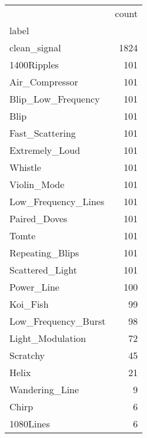 \begin{tabular}{lr}
\toprule
 & count \\
label &  \\
\midrule
clean_signal & 1824 \\
1400Ripples & 101 \\
Air_Compressor & 101 \\
Blip_Low_Frequency & 101 \\
Blip & 101 \\
Fast_Scattering & 101 \\
Extremely_Loud & 101 \\
Whistle & 101 \\
Violin_Mode & 101 \\
Low_Frequency_Lines & 101 \\
Paired_Doves & 101 \\
Tomte & 101 \\
Repeating_Blips & 101 \\
Scattered_Light & 101 \\
Power_Line & 100 \\
Koi_Fish & 99 \\
Low_Frequency_Burst & 98 \\
Light_Modulation & 72 \\
Scratchy & 45 \\
Helix & 21 \\
Wandering_Line & 9 \\
Chirp & 6 \\
1080Lines & 6 \\
\bottomrule
\end{tabular}
